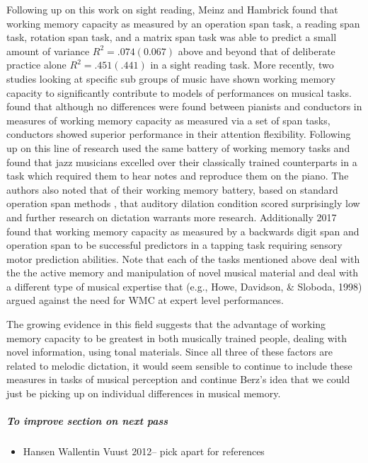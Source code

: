 \documentclass[]{book}
\providecommand{\tightlist}{%
  \setlength{\itemsep}{0pt}\setlength{\parskip}{0pt}}
\let\oldsubparagraph\subparagraph
\renewcommand{\subparagraph}[1]{\oldsubparagraph{#1}\mbox{}}
\theoremstyle{definition}
\theoremstyle{definition}
\theoremstyle{definition}
\theoremstyle{remark}
\begin{document}
Following up on this work on sight reading, Meinz and Hambrick found
that working memory capacity as measured by an operation span task, a
reading span task, rotation span task, and a matrix span task was able
to predict a small amount of variance \(R^2=.074(0.067)\) above and
beyond that of deliberate practice alone \(R^2=.451(.441)\) in a sight
reading task. More recently, two studies looking at specific sub groups
of music have shown working memory capacity to significantly contribute
to models of performances on musical tasks.
\citep{wollnerAttentionalFlexibilityMemory2016} found that although no
differences were found between pianists and conductors in measures of
working memory capacity as measured via a set of span tasks, conductors
showed superior performance in their attention flexibility. Following up
on this line of research \citep{nicholsScoreOneJazz2018} used the same
battery of working memory tasks and found that jazz musicians excelled
over their classically trained counterparts in a task which required
them to hear notes and reproduce them on the piano. The authors also
noted that of their working memory battery, based on standard operation
span methods \citep{engleWorkingMemoryCapacity2002}, that auditory
dilation condition scored surprisingly low and further research on
dictation warrants more research. Additionally
\citep{colleyWorkingMemoryAuditory2018} 2017 found that working memory
capacity as measured by a backwards digit span and operation span to be
successful predictors in a tapping task requiring sensory motor
prediction abilities. Note that each of the tasks mentioned above deal
with the the active memory and manipulation of novel musical material
and deal with a different type of musical expertise that (e.g., Howe,
Davidson, \& Sloboda, 1998) argued against the need for WMC at expert
level performances.

The growing evidence in this field suggests that the advantage of
working memory capacity to be greatest in both musically trained people,
dealing with novel information, using tonal materials. Since all three
of these factors are related to melodic dictation, it would seem
sensible to continue to include these measures in tasks of musical
perception and continue Berz's idea that we could just be picking up on
individual differences in musical memory.

\hypertarget{to-improve-section-on-next-pass}{%
\subparagraph{To improve section on next
pass}\label{to-improve-section-on-next-pass}}

\begin{itemize}
\tightlist
\item
  Hansen Wallentin Vuust 2012-- pick apart for references
\end{itemize}
\end{document}
